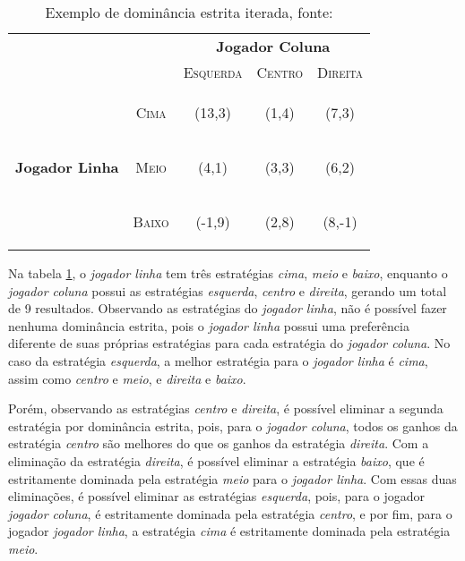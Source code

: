 \begin{table}[ht]
\centering
\begin{tabular}{|c|c|c|c|c|}
\cline{3-5}
\multicolumn{1}{c}{} &  & \multicolumn{3}{c|}{\textbf{Jogador Coluna}}\tabularnewline
\cline{3-5}
\multicolumn{1}{c}{} &  & \textsc{Esquerda} & \textsc{Centro} & \textsc{Direita}\tabularnewline
\hline
\multirow{3}{*}{\begin{turn}{90}
\textbf{Jogador Linha}
\end{turn}} & \begin{turn}{90}
\textsc{Cima}
\end{turn} & {\Large(13,3)} & {\Large(1,4)} & {\Large(7,3)} \tabularnewline
\cline{2-5}
 & \begin{turn}{90}
\textsc{Meio}
\end{turn} & {\Large(4,1)} & {\Large(3,3)} & {\Large(6,2)} \tabularnewline
\cline{2-5}
 & \begin{turn}{90}
\textsc{Baixo}
\end{turn} &  {\Large(-1,9)} & {\Large(2,8)} & {\Large(8,-1)} \tabularnewline
\hline
\end{tabular}
\caption{Exemplo de dominância estrita iterada, fonte: \cite{spaniel_2011}}
\label{tab:dominancia-estrita-iterada}
\end{table}

Na tabela \ref{tab:dominancia-estrita-iterada}, o \emph{jogador linha} tem três estratégias \emph{cima}, \emph{meio} e \emph{baixo}, enquanto o \emph{jogador coluna} possui as estratégias \emph{esquerda}, \emph{centro} e \emph{direita}, gerando um total de 9 resultados.
Observando as estratégias do \emph{jogador linha}, não é possível fazer nenhuma dominância estrita, pois o \emph{jogador linha} possui uma preferência diferente de suas próprias estratégias para cada estratégia do \emph{jogador coluna}. No caso da estratégia \emph{esquerda}, a melhor estratégia para o \emph{jogador linha} é \emph{cima}, assim como \emph{centro} e \emph{meio}, e \emph{direita} e \emph{baixo}.

Porém, observando as estratégias \emph{centro} e \emph{direita}, é possível eliminar a segunda estratégia por dominância estrita, pois, para o \emph{jogador coluna}, todos os ganhos da estratégia \emph{centro} são melhores do que os ganhos da estratégia \emph{direita}. Com a eliminação da estratégia \emph{direita}, é possível eliminar a estratégia \emph{baixo}, que é estritamente dominada pela estratégia \emph{meio} para o \emph{jogador linha}. Com essas duas eliminações, é possível eliminar as estratégias \emph{esquerda}, pois, para o jogador \emph{jogador coluna}, é estritamente dominada pela estratégia \emph{centro}, e por fim, para o jogador \emph{jogador linha}, a estratégia \emph{cima} é estritamente dominada pela estratégia \emph{meio}.

